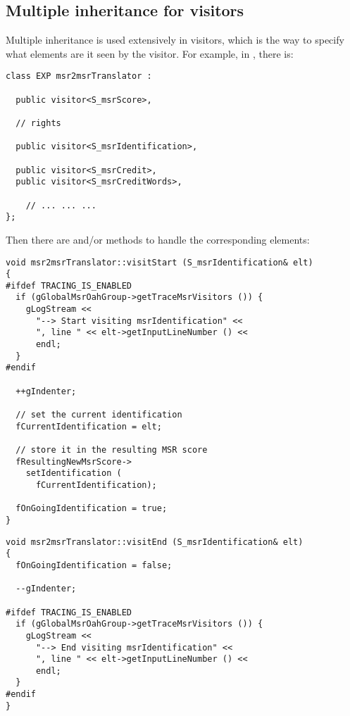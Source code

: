\subsection{Multiple inheritance for visitors}

Multiple inheritance is used extensively in visitors, which is the way to specify what elements are {it seen} by the visitor. For example, in , there is:
\begin{lstlisting}[language=CPlusPlus]
class EXP msr2msrTranslator :

  public visitor<S_msrScore>,

  // rights

  public visitor<S_msrIdentification>,

  public visitor<S_msrCredit>,
  public visitor<S_msrCreditWords>,

    // ... ... ...
};
\end{lstlisting}

Then there are  and/or  methods to handle the corresponding elements:
\begin{lstlisting}[language=CPlusPlus]
void msr2msrTranslator::visitStart (S_msrIdentification& elt)
{
#ifdef TRACING_IS_ENABLED
  if (gGlobalMsrOahGroup->getTraceMsrVisitors ()) {
    gLogStream <<
      "--> Start visiting msrIdentification" <<
      ", line " << elt->getInputLineNumber () <<
      endl;
  }
#endif

  ++gIndenter;

  // set the current identification
  fCurrentIdentification = elt;

  // store it in the resulting MSR score
  fResultingNewMsrScore->
    setIdentification (
      fCurrentIdentification);

  fOnGoingIdentification = true;
}
\end{lstlisting}

\begin{lstlisting}[language=CPlusPlus]
void msr2msrTranslator::visitEnd (S_msrIdentification& elt)
{
  fOnGoingIdentification = false;

  --gIndenter;

#ifdef TRACING_IS_ENABLED
  if (gGlobalMsrOahGroup->getTraceMsrVisitors ()) {
    gLogStream <<
      "--> End visiting msrIdentification" <<
      ", line " << elt->getInputLineNumber () <<
      endl;
  }
#endif
}
\end{lstlisting}

